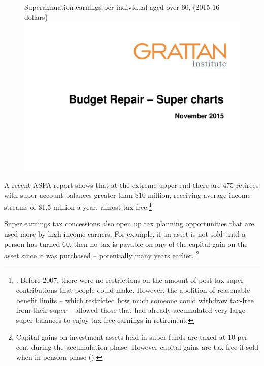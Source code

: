 \documentclass{grattanAlpha}
\begin{document}
\begin{figure}
%
{Superannuation earnings per individual aged over 60, (2015-16 dollars)} \label{fig:SUPER-6-1}
\includegraphics[width=\columnwidth,page=31]{super-atlas/PPTX.pdf}

\end{figure}
A recent ASFA report shows that at the extreme upper end there are 475 retirees with super account balances greater than \$10 million, receiving average income streams of \$1.5 million a year, almost tax-free.\footnote{\textcite{ASFA2015TreasurySubmission}. Before 2007, there were no restrictions on the amount of post-tax super contributions that people could make. However, the abolition of reasonable benefit limits – which restricted how much someone could withdraw tax-free from their super – allowed those that had already accumulated very large super balances to enjoy tax-free earnings in retirement.}

Super earnings tax concessions also open up tax planning opportunities that are used more by high-income earners. For example, if an asset is not sold until a person has turned 60, then no tax is payable on any of the capital gain on the asset since it was purchased – potentially many years earlier.%
\footnote{Capital gains on investment assets held in super funds are taxed at 10 per cent during the accumulation phase. However capital gains are tax free if sold when in pension phase (\textcite[][69]{Treasury2015ReThink}).}
\end{document}
